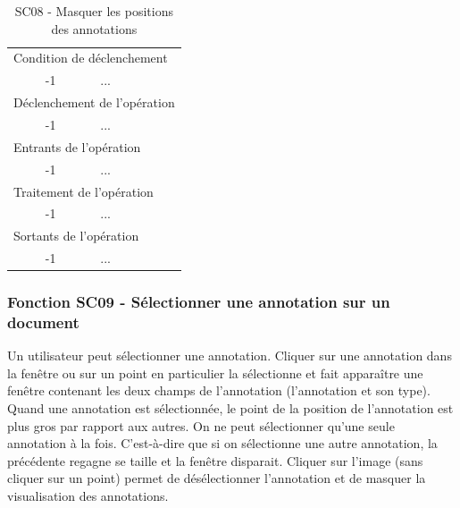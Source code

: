 \documentclass[a4paper]{article}
\begin{document}
\begin{table}[H]
  \centering
   \small
	\begin{tabular}{|c|p{12cm}|}
   		\hline
   			\rowcolor{lightgray}\multicolumn{2}{|c|}{\textbf{SC08 - Masquer les positions des annotations}} \\
   		\hline
   			\multicolumn{2}{|l|}{Condition de d\'eclenchement} \\
   		\hline
   			-1 & ...\\
   		\hline
   			\multicolumn{2}{|l|}{D\'eclenchement de l'op\'eration} \\
   		\hline
   			-1 & ...\\
   		\hline
   			\multicolumn{2}{|l|}{Entrants de l'op\'eration} \\
   		\hline
   			-1 & ...\\
   		\hline
   			\multicolumn{2}{|l|}{Traitement de l'op\'eration} \\
  		\hline
   			-1 & ...\\
   		\hline
   			\multicolumn{2}{|l|}{Sortants de l'op\'eration} \\
   		\hline
   			-1 & ...\\
   		\hline
	\end{tabular}
  \caption{SC08 - Masquer les positions des annotations}
  \normalsize
  \label{tab:masquer_position_annotation}
\end{table}

\subsubsection{Fonction SC09 - Sélectionner une annotation sur un document}
Un utilisateur peut sélectionner une annotation. Cliquer sur une annotation dans la fenêtre ou sur un point en particulier la sélectionne et fait apparaître une fenêtre contenant les deux champs de l’annotation (l’annotation et son type). Quand une annotation est sélectionnée, le point de la position de l’annotation est plus gros par rapport aux autres. On ne peut sélectionner qu’une seule annotation à la fois. C’est-à-dire que si on sélectionne une autre annotation, la précédente regagne se taille et la fenêtre disparait. Cliquer sur l’image (sans cliquer sur un point) permet de désélectionner l’annotation et de masquer la visualisation des annotations.\\
\end{document}
